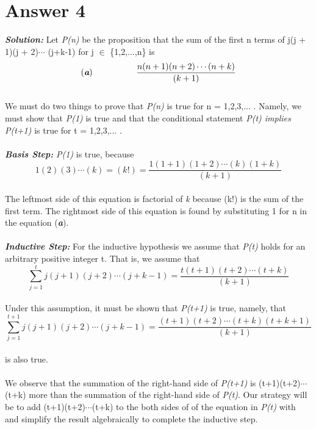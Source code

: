 \documentclass[12pt]{article}
\begin{document}
\section*{Answer 4}
\hspace*{0.6cm} \textbf{\textit{Solution:} } Let \textit{P(n)} be the proposition that the sum of the first n terms of j(j + 1)(j + 2)$\cdots$ (j+k-1) for j $\in$ \{1,2,...,n\} is\\
\[(\textit{\textbf{a}}) \hspace{1.8cm}\frac{n(n+1)(n+2)\cdots(n+k)}{(k+1)}\]  \\
We must do two things to prove that \textit{P(n)} is true for n = 1,2,3,... . Namely, we must show that \textit{P(1)} is true and that the conditional statement \textit{P(t) implies P(t+1)} is true for t = 1,2,3,... .\\
\vspace*{0.2cm}\\
\hspace*{0.6cm} \textbf{\textit{Basis Step:} } \textit{P(1)} is true, because  \\
\[1(2)(3)\cdots(k) = (k!) = \frac{1(1+1)(1+2)\cdots(k)(1+k)}{(k+1)}\]\\
The leftmost side of this equation is factorial of \textit{k} because (k!) is the sum of the first term. The rightmost side of this equation is found by substituting 1 for n in the equation (\textit{\textbf{a}}). \\
\vspace*{0.2cm}\\
\hspace*{0.6cm} \textbf{\textit{Inductive Step:} } For the inductive hypothesis we assume that \textit{P(t)} holds for an arbitrary positive integer t. That is, we assume that \\
\[\sum_{j=1}^{t}j(j + 1)(j + 2)\cdots (j+k-1)  = \frac{t(t+1)(t+2)\cdots(t+k)}{(k+1)}\]\\
Under this assumption, it must be shown that \textit{P(t+1)} is true, namely, that\\
\[\sum_{j=1}^{t+1}j(j + 1)(j + 2)\cdots (j+k-1)  = \frac{(t+1)(t+2)\cdots(t+k)(t+k+1)}{(k+1)}\]\\
is also true.\\
\vspace*{0.2cm}\\
We observe that the summation of the right-hand side of \textit{P(t+1)} is (t+1)(t+2)$\cdots$(t+k) more than the summation of the right-hand side of \textit{P(t)}. Our strategy will be to add (t+1)(t+2)$\cdots$(t+k) to the both sides of of the equation in \textit{P(t)} with and simplify the result algebraically to complete the inductive step.\\
\end{document}
